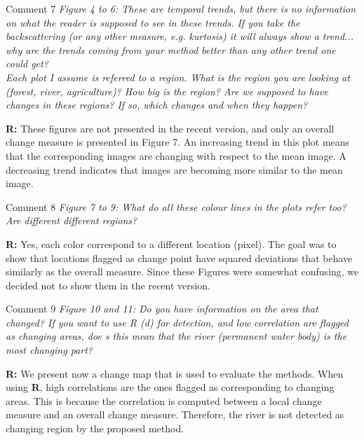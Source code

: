 \documentclass[11pt]{report}
\begin{document}
\medskip
\begin{mybox}{Comment 7}
\textit{Figure 4 to 6: These are temporal trends, but there is no information on what the reader is supposed to see
in these trends. If you take the backscattering (or any other measure, e.g. kurtosis) it will always show a trend...
why are the trends coming from your method better than any other trend one could get?\\
Each plot I assume is referred to a region. What is the region you are looking at (forest, river, agriculture)?
How big is the region? Are we supposed to have changes in these regions? If so, which changes and when they
happen?}


\medskip
\textbf{R:} These figures are not presented in the recent version, and only an overall change measure is presented in Figure 7. An increasing trend in this plot means that the corresponding images are changing with respect to the mean image. A decreasing trend indicates that images are becoming more similar to the mean image.
\end{mybox}

\medskip
\begin{mybox}{Comment 8}
\textit{Figure 7 to 9: What do all these colour lines in the plots refer too? Are different different regions?}


\medskip
\textbf{R:} Yes, each color correspond to a different location (pixel). The goal was to show that locations flagged as change point have squared deviations that behave similarly as the overall measure. Since these Figures were somewhat confusing, we decided not to show them in the recent version.
\end{mybox}

\medskip
\begin{mybox}{Comment 9}
\textit{Figure 10 and 11: Do you have information on the area that changed? If you want to use R (d) for detection,
and low correlation are flagged as changing areas, doe s this mean that the river (permanent water body) is the
most changing part?}

\medskip
\textbf{R:} We present now a change map that is used to evaluate the methods. When using $\mathbf{R}$, high correlations are the ones flagged as corresponding to changing areas. This is because the correlation is computed between a local change measure and an overall change measure. Therefore, the river is not detected as changing region by the proposed method.
\end{mybox}
\end{document}
